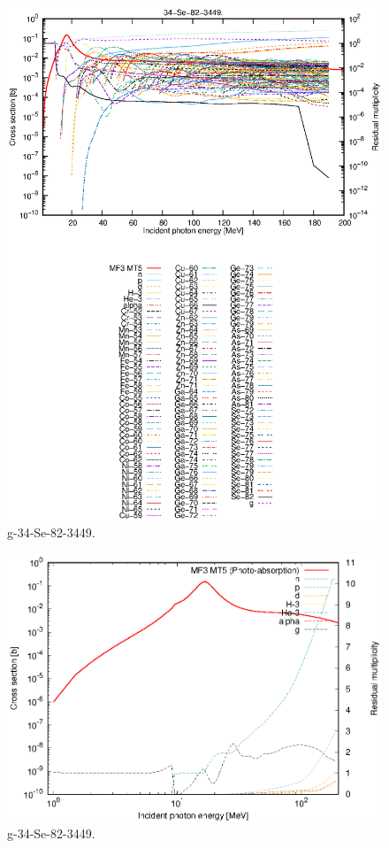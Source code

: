 \begin{figure}
 \includegraphics[width=\linewidth]{eps/g_34-Se-82_3449.eps}
  \caption{g-34-Se-82-3449.}
\end{figure}
\newpage \clearpage

\begin{figure}
 \includegraphics[width=\linewidth]{eps-log/g_34-Se-82_3449.eps}
 \caption{g-34-Se-82-3449.}
\end{figure}
\newpage \clearpage

